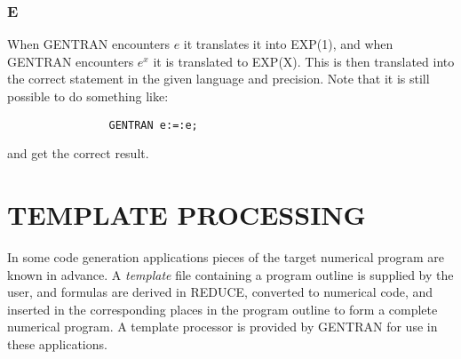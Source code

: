 \subsection{E}
When GENTRAN encounters $e$ it translates it into EXP(1), and when GENTRAN
encounters
$e^x$ it is translated to EXP(X).  This is then translated
into the correct statement in the given language and precision.  Note that
it is still possible to do something like:
\begin{verbatim}
                GENTRAN e:=:e;
\end{verbatim}
and get the correct result.

\chapter{TEMPLATE PROCESSING}

In some code generation applications pieces of the target numerical
program are known in advance.  A {\it template} file containing a program
outline is supplied by the user, and formulas are derived in REDUCE,
converted to numerical code, and inserted in the corresponding
places in the program outline
to form a complete numerical program.  A template processor is provided by
GENTRAN for use in these applications.

